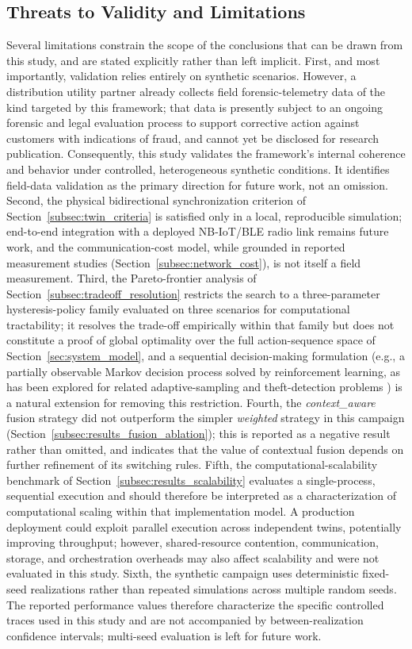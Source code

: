 \documentclass{ieeeaccess}
\begin{document}
\subsection{Threats to Validity and Limitations}
\label{subsec:limitations}
Several limitations constrain the scope of the conclusions that can be drawn from this study, and are stated explicitly rather than left implicit. First, and most importantly, validation relies entirely on synthetic scenarios. However, a distribution utility partner already collects field forensic-telemetry data of the kind targeted by this framework; that data is presently subject to an ongoing forensic and legal evaluation process to support corrective action against customers with indications of fraud, and cannot yet be disclosed for research publication. Consequently, this study validates the framework's internal coherence and behavior under controlled, heterogeneous synthetic conditions. It identifies field-data validation as the primary direction for future work, not an omission. Second, the physical bidirectional synchronization criterion of Section~\ref{subsec:twin_criteria} is satisfied only in a local, reproducible simulation; end-to-end integration with a deployed NB-IoT/BLE radio link remains future work, and the communication-cost model, while grounded in reported measurement studies (Section~\ref{subsec:network_cost}), is not itself a field measurement. Third, the Pareto-frontier analysis of Section~\ref{subsec:tradeoff_resolution} restricts the search to a three-parameter hysteresis-policy family evaluated on three scenarios for computational tractability; it resolves the trade-off empirically within that family but does not constitute a proof of global optimality over the full action-sequence space of Section~\ref{sec:system_model}, and a sequential decision-making formulation (e.g., a partially observable Markov decision process solved by reinforcement learning, as has been explored for related adaptive-sampling and theft-detection problems \cite{b38}) is a natural extension for removing this restriction. Fourth, the \textit{context\_aware} fusion strategy did not outperform the simpler \textit{weighted} strategy in this campaign (Section~\ref{subsec:results_fusion_ablation}); this is reported as a negative result rather than omitted, and indicates that the value of contextual fusion depends on further refinement of its switching rules. Fifth, the computational-scalability benchmark of Section~\ref{subsec:results_scalability} evaluates a single-process, sequential execution and should therefore be interpreted as a characterization of computational scaling within that implementation model. A production deployment could exploit parallel execution across independent twins, potentially improving throughput; however, shared-resource contention, communication, storage, and orchestration overheads may also affect scalability and were not evaluated in this study. Sixth, the synthetic campaign uses deterministic fixed-seed realizations rather than repeated simulations across multiple random seeds. The reported performance values therefore characterize the specific controlled traces used in this study and are not accompanied by between-realization confidence intervals; multi-seed evaluation is left for future work.
\end{document}
